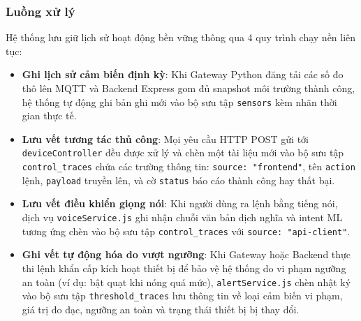 
\subsubsection{Luồng xử lý}
Hệ thống lưu giữ lịch sử hoạt động bền vững thông qua 4 quy trình chạy nền liên tục:
\begin{itemize}
    \item \textbf{Ghi lịch sử cảm biến định kỳ}: Khi Gateway Python đăng tải các số đo thô lên MQTT và Backend Express gom đủ snapshot môi trường thành công, hệ thống tự động ghi bản ghi mới vào bộ sưu tập \texttt{sensors} kèm nhãn thời gian thực tế.
    \item \textbf{Lưu vết tương tác thủ công}: Mọi yêu cầu HTTP POST gửi tới \texttt{deviceController} đều được xử lý và chèn một tài liệu mới vào bộ sưu tập \texttt{control\_traces} chứa các trường thông tin: \texttt{source: "frontend"}, tên \texttt{action} lệnh, \texttt{payload} truyền lên, và cờ \texttt{status} báo cáo thành công hay thất bại.
    \item \textbf{Lưu vết điều khiển giọng nói}: Khi người dùng ra lệnh bằng tiếng nói, dịch vụ \texttt{voiceService.js} ghi nhận chuỗi văn bản dịch nghĩa và intent ML tương ứng chèn vào bộ sưu tập \texttt{control\_traces} với \texttt{source: "api-client"}.
    \item \textbf{Ghi vết tự động hóa do vượt ngưỡng}: Khi Gateway hoặc Backend thực thi lệnh khẩn cấp kích hoạt thiết bị để bảo vệ hệ thống do vi phạm ngưỡng an toàn (ví dụ: bật quạt khi nóng quá mức), \texttt{alertService.js} chèn nhật ký vào bộ sưu tập \texttt{threshold\_traces} lưu thông tin về loại cảm biến vi phạm, giá trị đo đạc, ngưỡng an toàn và trạng thái thiết bị bị thay đổi.
\end{itemize}

